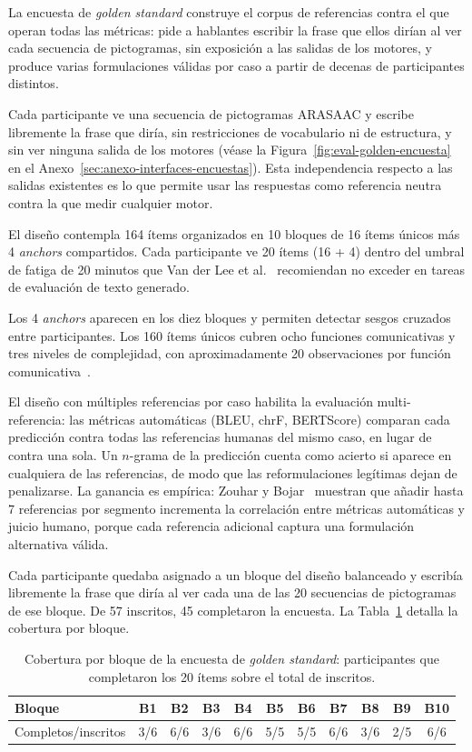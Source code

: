 La encuesta de \textit{golden standard} construye el corpus de referencias contra el que operan todas las métricas: pide a hablantes escribir la frase que ellos dirían al ver cada secuencia de pictogramas, sin exposición a las salidas de los motores, y produce varias formulaciones válidas por caso a partir de decenas de participantes distintos.

Cada participante ve una secuencia de pictogramas ARASAAC y escribe libremente la frase que diría, sin restricciones de vocabulario ni de estructura, y sin ver ninguna salida de los motores (véase la Figura~\ref{fig:eval-golden-encuesta} en el Anexo~\ref{sec:anexo-interfaces-encuestas}). Esta independencia respecto a las salidas existentes es lo que permite usar las respuestas como referencia neutra contra la que medir cualquier motor.

El diseño contempla 164 ítems organizados en 10 bloques de 16 ítems únicos más 4 \textit{anchors} compartidos. Cada participante ve 20 ítems (16 + 4) dentro del umbral de fatiga de 20 minutos que Van der Lee et al.~\cite{vanderlee2021human} recomiendan no exceder en tareas de evaluación de texto generado.

Los 4 \textit{anchors} aparecen en los diez bloques y permiten detectar sesgos cruzados entre participantes. Los 160 ítems únicos cubren ocho funciones comunicativas y tres niveles de complejidad, con aproximadamente 20 observaciones por función comunicativa~\cite{reiter2009investigation}.

El diseño con múltiples referencias por caso habilita la evaluación multi-referencia: las métricas automáticas (BLEU, chrF, BERTScore) comparan cada predicción contra todas las referencias humanas del mismo caso, en lugar de contra una sola. Un $n$-grama de la predicción cuenta como acierto si aparece en cualquiera de las referencias, de modo que las reformulaciones legítimas dejan de penalizarse. La ganancia es empírica: Zouhar y Bojar~\cite{zouhar2024quality} muestran que añadir hasta 7 referencias por segmento incrementa la correlación entre métricas automáticas y juicio humano, porque cada referencia adicional captura una formulación alternativa válida.

Cada participante quedaba asignado a un bloque del diseño balanceado y escribía libremente la frase que diría al ver cada una de las 20 secuencias de pictogramas de ese bloque. De 57 inscritos, 45 completaron la encuesta. La Tabla~\ref{tab:eval-golden-cobertura} detalla la cobertura por bloque.

\begin{table}[ht]
\centering
\small
\begin{tabular}{l c c c c c c c c c c}
\hline
Bloque & B1 & B2 & B3 & B4 & B5 & B6 & B7 & B8 & B9 & B10 \\
\hline
Completos/inscritos & 3/6 & 6/6 & 3/6 & 6/6 & 5/5 & 5/5 & 6/6 & 3/6 & 2/5 & 6/6 \\
\hline
\end{tabular}
\caption{Cobertura por bloque de la encuesta de \textit{golden standard}: participantes que completaron los 20 ítems sobre el total de inscritos.}
\label{tab:eval-golden-cobertura}
\end{table}

